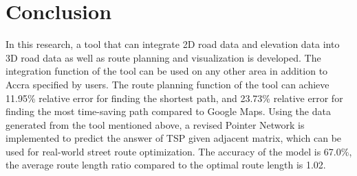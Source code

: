\documentclass[final-report]{report-template}
\begin{document}
\section{Conclusion}
In this research, a tool that can integrate 2D road data and elevation data into 3D road data as well as route planning and visualization is developed.
The integration function of the tool can be used on any other area in addition to Accra specified by users. 
The route planning function of the tool can achieve 11.95\% relative error for finding the shortest path,
and 23.73\% relative error for finding the most time-saving path compared to Google Maps.
Using the data generated from the tool mentioned above, 
a revised Pointer Network is implemented to predict the answer of TSP given adjacent matrix, 
which can be used for real-world street route optimization.
The accuracy of the model is 67.0\%, the average route length ratio compared to the optimal route length is 1.02.


\end{document}
